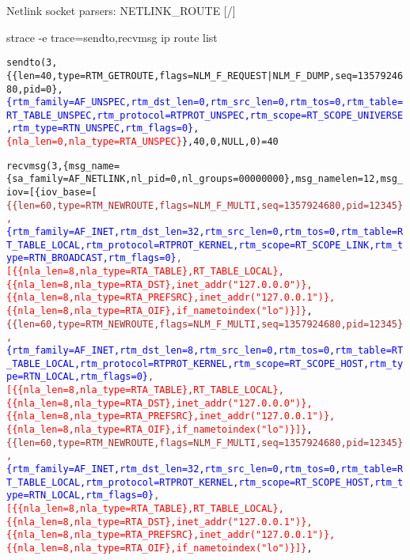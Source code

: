\documentclass[unicode,aspectratio=169]{beamer}
\begin{document}
\begin{frame}{Netlink socket parsers: NETLINK\_ROUTE \hfill [\insertframenumber/\inserttotalframenumber]}
\tiny
\begin{block}{\large strace -e trace=sendto,recvmsg ip route list}
\begin{alltt}
sendto(3, \{\{len=40, type=RTM\_GETROUTE, flags=NLM\_F\_REQUEST|NLM\_F\_DUMP, seq=1357924680, pid=0\},
 \textcolor{blue}{\{rtm\_family=AF\_UNSPEC, rtm\_dst\_len=0, rtm\_src\_len=0, rtm\_tos=0, rtm\_table=RT\_TABLE\_UNSPEC, rtm\_protocol=RTPROT\_UNSPEC, rtm\_scope=RT\_SCOPE\_UNIVERSE, rtm\_type=RTN\_UNSPEC, rtm\_flags=0\}},
  \textcolor{red}{\{nla\_len=0, nla\_type=RTA\_UNSPEC\}}\}, 40, 0, NULL, 0) = 40

\smallskip
recvmsg(3, \{msg\_name=\{sa\_family=AF\_NETLINK, nl\_pid=0, nl\_groups=00000000\}, msg\_namelen=12, msg\_iov=[\{iov\_base=[
\textcolor{brown}{\{\{len=60, type=RTM\_NEWROUTE, flags=NLM\_F\_MULTI, seq=1357924680, pid=12345\},
 \textcolor{blue}{\{rtm\_family=AF\_INET, rtm\_dst\_len=32, rtm\_src\_len=0, rtm\_tos=0, rtm\_table=RT\_TABLE\_LOCAL, rtm\_protocol=RTPROT\_KERNEL, rtm\_scope=RT\_SCOPE\_LINK, rtm\_type=RTN\_BROADCAST, rtm\_flags=0\}},
  \textcolor{red}{[\{\{nla\_len=8, nla\_type=RTA\_TABLE\}, RT\_TABLE\_LOCAL\}, \{\{nla\_len=8, nla\_type=RTA\_DST\}, inet\_addr("127.0.0.0")\}, \{\{nla\_len=8, nla\_type=RTA\_PREFSRC\}, inet\_addr("127.0.0.1")\}, \{\{nla\_len=8, nla\_type=RTA\_OIF\}, if\_nametoindex("lo")\}]}\}},
\textcolor{brown}{\{\{len=60, type=RTM\_NEWROUTE, flags=NLM\_F\_MULTI, seq=1357924680, pid=12345\},
 \textcolor{blue}{\{rtm\_family=AF\_INET, rtm\_dst\_len=8, rtm\_src\_len=0, rtm\_tos=0, rtm\_table=RT\_TABLE\_LOCAL, rtm\_protocol=RTPROT\_KERNEL, rtm\_scope=RT\_SCOPE\_HOST, rtm\_type=RTN\_LOCAL, rtm\_flags=0\}},
  \textcolor{red}{[\{\{nla\_len=8, nla\_type=RTA\_TABLE\}, RT\_TABLE\_LOCAL\}, \{\{nla\_len=8, nla\_type=RTA\_DST\}, inet\_addr("127.0.0.0")\}, \{\{nla\_len=8, nla\_type=RTA\_PREFSRC\}, inet\_addr("127.0.0.1")\}, \{\{nla\_len=8, nla\_type=RTA\_OIF\}, if\_nametoindex("lo")\}]}\}},
\textcolor{brown}{\{\{len=60, type=RTM\_NEWROUTE, flags=NLM\_F\_MULTI, seq=1357924680, pid=12345\},
 \textcolor{blue}{\{rtm\_family=AF\_INET, rtm\_dst\_len=32, rtm\_src\_len=0, rtm\_tos=0, rtm\_table=RT\_TABLE\_LOCAL, rtm\_protocol=RTPROT\_KERNEL, rtm\_scope=RT\_SCOPE\_HOST, rtm\_type=RTN\_LOCAL, rtm\_flags=0\}},
  \textcolor{red}{[\{\{nla\_len=8, nla\_type=RTA\_TABLE\}, RT\_TABLE\_LOCAL\}, \{\{nla\_len=8, nla\_type=RTA\_DST\}, inet\_addr("127.0.0.1")\}, \{\{nla\_len=8, nla\_type=RTA\_PREFSRC\}, inet\_addr("127.0.0.1")\}, \{\{nla\_len=8, nla\_type=RTA\_OIF\}, if\_nametoindex("lo")\}]}\}},

\end{alltt}
\end{block}
\end{frame}
\end{document}
